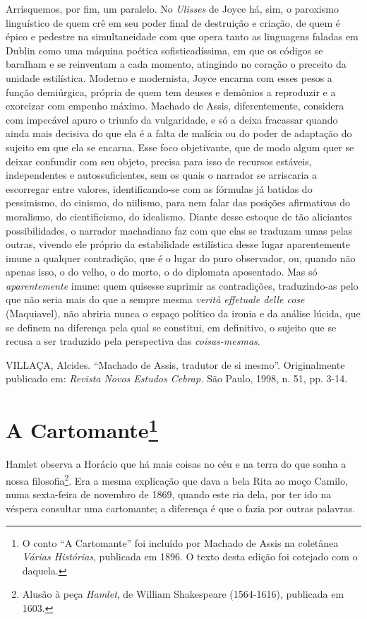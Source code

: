 Arrisquemos, por fim, um paralelo. No \emph{Ulisses} de Joyce há, sim, o
paroxismo linguístico de quem crê em seu poder final de destruição e
criação, de quem é épico e pedestre na simultaneidade com que opera
tanto as linguagens faladas em Dublin como uma máquina poética
sofisticadíssima, em que os códigos se baralham e se reinventam a cada
momento, atingindo no coração o preceito da unidade estilística. Moderno
e modernista, Joyce encarna com esses pesos a função demiúrgica, própria
de quem tem deuses e demônios a reproduzir e a exorcizar com empenho
máximo. Machado de Assis, diferentemente, considera com impecável apuro
o triunfo da vulgaridade, e só a deixa fracassar quando ainda mais
decisiva do que ela é a falta de malícia ou do poder de adaptação do
sujeito em que ela se encarna. Esse foco objetivante, que de modo algum
quer se deixar confundir com seu objeto, precisa para isso de recursos
estáveis, independentes e autossuficientes, sem os quais o narrador se
arriscaria a escorregar entre valores, identificando-se com as fórmulas
já batidas do pessimismo, do cinismo, do niilismo, para nem falar das
posições afirmativas do moralismo, do cientificismo, do idealismo.
Diante desse estoque de tão aliciantes possibilidades, o narrador
machadiano faz com que elas se traduzam umas pelas outras, vivendo ele
próprio da estabilidade estilística desse lugar aparentemente imune a
qualquer contradição, que é o lugar do puro observador, ou, quando não
apenas isso, o do velho, o do morto, o do diplomata aposentado. Mas só
\emph{aparentemente} imune: quem quisesse suprimir as contradições,
traduzindo-as pelo que não seria mais do que a sempre mesma \emph{verità
effetuale delle cose} (Maquiavel), não abriria nunca o espaço político
da ironia e da análise lúcida, que se definem na diferença pela qual se
constitui, em definitivo, o sujeito que se recusa a ser traduzido pela
perspectiva das \emph{coisas-mesmas}.

VILLAÇA, Alcides. ``Machado de Assis, tradutor de si mesmo''.
Originalmente publicado em: \emph{Revista Novos Estudos Cebrap.} São
Paulo, 1998, n. 51, pp. 3-14.

\chapter{A Cartomante\footnote[*]{O conto ``A Cartomante'' foi incluído por
  Machado de Assis na coletânea \emph{Várias Histórias}, publicada em
  1896. O texto desta edição foi cotejado com o daquela.}}

Hamlet observa a Horácio que há mais coisas no céu e na terra do que
sonha a nossa filosofia\footnote{Alusão à peça \emph{Hamlet}, de William
  Shakespeare (1564-1616), publicada em 1603.}. Era a mesma explicação
que dava a bela Rita ao moço Camilo, numa sexta-feira de novembro de
1869, quando este ria dela, por ter ido na véspera consultar uma
cartomante; a diferença é que o fazia por outras palavras.

